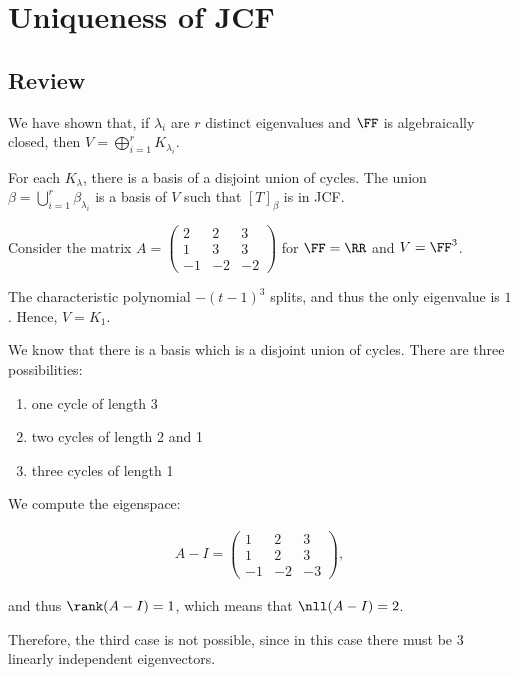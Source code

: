 \documentclass[11pt]{scrartcl}
\begin{document}
\section{Uniqueness of JCF}

\subsection{Review}

We have shown that, if $\lambda_i$ are $r$ distinct eigenvalues and $\FF$ is algebraically closed, then $V=\bigoplus_{i=1}^{r} K_{\lambda_i}$.

For each $K_{\lambda}$, there is a basis of a disjoint union of cycles. The union $\beta = \bigcup_{i=1}^r \beta_{\lambda_i}$ is a basis of $V$ such that $[T]_{\beta}$ is in JCF.

\begin{example}

  Consider the matrix
  $A = \begin{pmatrix}
    2  & 2  & 3 \\
    1  & 3  & 3 \\
    -1 & -2 & -2
  \end{pmatrix}$ for $\FF = \RR$ and $V = \FF^3$.

  The characteristic polynomial $-(t-1)^3$ splits, and thus the only
  eigenvalue is $1$. Hence, $V = K_1$.

  We know that there is a basis which is a disjoint union of
  cycles. There are three possibilities:

  \begin{enumerate}
  \item one cycle of length 3
  \item two cycles of length 2 and 1 
  \item three cycles of length 1
  \end{enumerate} 

  We compute the eigenspace:

  \begin{align}
    A-I = \begin{pmatrix}
      1  & 2  & 3 \\
      1  & 2  & 3 \\
      -1 & -2 & -3
    \end{pmatrix}, 
  \end{align}

  and thus $\rank(A-I) = 1$, which means that $\nll (A-I) = 2$.

  Therefore, the third case is not possible, since in this case there must
  be 3 linearly independent eigenvectors.


\end{example}
\end{document}
